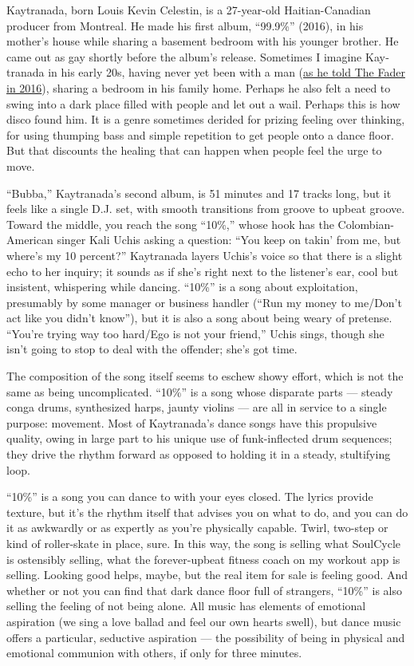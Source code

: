 Kay­tranada, born Louis Kevin Celestin, is a 27-year-old
Haitian-Canadian producer from Montreal. He made his first album,
``99.9\%'' (2016), in his mother's house while sharing a basement
bedroom with his younger brother. He came out as gay shortly before the
album's release. Sometimes I imagine Kay­tranada in his early 20s,
having never yet been with a man
(\href{https://www.thefader.com/2016/04/05/kaytranada-album-interview-99-percent}{as
he told The Fader in 2016}), sharing a bedroom in his family home.
Perhaps he also felt a need to swing into a dark place filled with
people and let out a wail. Perhaps this is how disco found him. It is a
genre sometimes derided for prizing feeling over thinking, for using
thumping bass and simple repetition to get people onto a dance floor.
But that discounts the healing that can happen when people feel the urge
to move.

``Bubba,'' Kay­tranada's second album, is 51 minutes and 17 tracks long,
but it feels like a single D.J. set, with smooth transitions from groove
to upbeat groove. Toward the middle, you reach the song ``10\%,'' whose
hook has the Colombian-American singer Kali Uchis asking a question:
``You keep on takin' from me, but where's my 10 percent?'' Kay­tranada
layers Uchis's voice so that there is a slight echo to her inquiry; it
sounds as if she's right next to the listener's ear, cool but insistent,
whispering while dancing. ``10\%'' is a song about exploitation,
presumably by some manager or business handler (``Run my money to
me/Don't act like you didn't know''), but it is also a song about being
weary of pretense. ``You're trying way too hard/Ego is not your
friend,'' Uchis sings, though she isn't going to stop to deal with the
offender; she's got time.

The composition of the song itself seems to eschew showy effort, which
is not the same as being uncomplicated. ``10\%'' is a song whose
disparate parts --- steady conga drums, synthesized harps, jaunty
violins --- are all in service to a single purpose: movement. Most of
Kay­tranada's dance songs have this propulsive quality, owing in large
part to his unique use of funk-inflected drum sequences; they drive the
rhythm forward as opposed to holding it in a steady, stultifying loop.

``10\%'' is a song you can dance to with your eyes closed. The lyrics
provide texture, but it's the rhythm itself that advises you on what to
do, and you can do it as awkwardly or as expertly as you're physically
capable. Twirl, two-step or kind of roller-skate in place, sure. In this
way, the song is selling what Soul­Cycle is ostensibly selling, what the
forever-upbeat fitness coach on my workout app is selling. Looking good
helps, maybe, but the real item for sale is feeling good. And whether or
not you can find that dark dance floor full of strangers, ``10\%'' is
also selling the feeling of not being alone. All music has elements of
emotional aspiration (we sing a love ballad and feel our own hearts
swell), but dance music offers a particular, seductive aspiration ---
the possibility of being in physical and emotional communion with
others, if only for three minutes.

